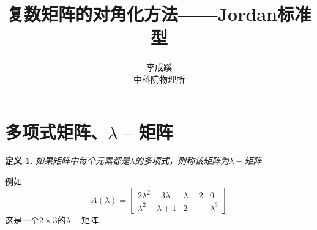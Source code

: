 \documentclass[a4paper,11pt]{article}
\newtheorem{definition}{\hspace{2em}定义}[section]
\begin{document}
    \title{复数矩阵的对角化方法——Jordan标准型}
    \author{李成蹊\\中科院物理所}
    \maketitle
    \section{多项式矩阵、$\lambda-$矩阵}
    \begin{definition}
        如果矩阵中每个元素都是$\lambda$的多项式，则称该矩阵为$\lambda-$矩阵
    \end{definition}
    例如
    \begin{equation*}
        A(\lambda)=\begin{bmatrix}
            2\lambda^2-3\lambda&\lambda-2&0\\
            \lambda^2-\lambda+1&2&\lambda^3
        \end{bmatrix}
    \end{equation*}
    这是一个$2\times 3$的$\lambda-$矩阵.
\end{document}
